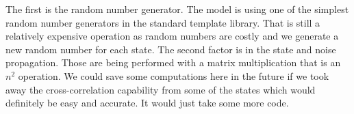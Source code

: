 The first is the random number generator.  The model is using
one of the simplest random number generators in the standard template library.
That is still a relatively expensive operation as random numbers are costly and
we generate a new random number for each state.  The second factor is in the
state and noise propagation.  Those are being performed with a matrix
multiplication that is an $n^2$ operation.  We could save some computations
here in the future if we took away the cross-correlation capability from some
of the states which would definitely be easy and accurate.  It would just take
some more code.

